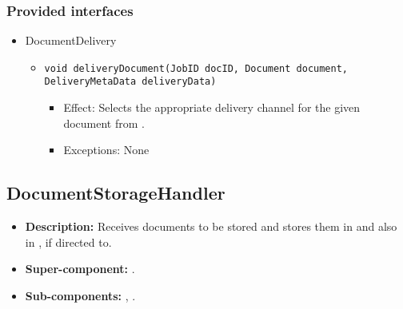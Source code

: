 \subsubsection*{Provided interfaces}
\begin{itemize}
    \item DocumentDelivery
    \begin{itemize}
        \item \texttt{void deliveryDocument(JobID docID, Document document, DeliveryMetaData deliveryData)}
        \begin{itemize}
            \item Effect: Selects the appropriate delivery channel for the given document from .
            \item Exceptions: None
        \end{itemize}
    \end{itemize}
\end{itemize}


\subsection{DocumentStorageHandler} 
\begin{itemize}
    \item \textbf{Description:} Receives documents to be stored and stores them in  and also in , if directed to.
    \item \textbf{Super-component:} .
    \item \textbf{Sub-components:} , .
\end{itemize}

